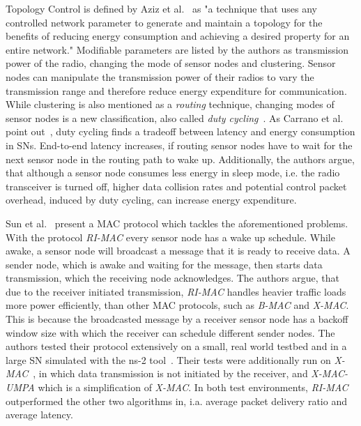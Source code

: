 Topology Control is defined by Aziz et al.~\cite{aziz2013survey} as "a
technique that uses any controlled network parameter to generate and maintain a
topology for the benefits of reducing energy consumption and achieving a
desired property for an entire network." Modifiable parameters are listed by
the authors as transmission power of the radio, changing the mode of sensor
nodes and clustering. Sensor nodes can manipulate the transmission power of
their radios to vary the transmission range and therefore reduce energy
expenditure for communication. While clustering is also mentioned as a
\textit{routing} technique, changing modes of sensor nodes is a new
classification, also called \textit{duty cycling}~\cite{carrano2014survey,
lin2004medium, buettner2006x}. As Carrano et al. point
out~\cite{carrano2014survey}, duty cycling finds a tradeoff between latency and
energy consumption in \acp{SN}. End-to-end latency increases, if routing sensor
nodes have to wait for the next sensor node in the routing path to wake up.
Additionally, the authors argue, that although a sensor node consumes less
energy in sleep mode, i.e. the radio transceiver is turned off, higher data
collision rates and potential control packet overhead, induced by duty cycling,
can increase energy expenditure.

Sun et al.~\cite{sun2008ri} present a \ac{MAC} protocol which tackles the
aforementioned problems. With the protocol \textit{RI-MAC} every sensor node
has a wake up schedule. While awake, a sensor node will broadcast a message
that it is ready to receive data. A sender node, which is awake and waiting for
the message, then starts data transmission, which the receiving node
acknowledges. The authors argue, that due to the receiver initiated
transmission, \textit{RI-MAC} handles heavier traffic loads more power
efficiently, than other \ac{MAC} protocols, such as \textit{B-MAC} and
\textit{X-MAC}. This is because the broadcasted message by a receiver sensor
node has a backoff window size with which the receiver can schedule different
sender nodes. The authors tested their protocol extensively on a small, real
world testbed and in a large \ac{SN} simulated with the ns-2
tool~\cite{bajaj1999improving}. Their tests were additionally run on
\textit{X-MAC}~\cite{buettner2006x}, in which data transmission is not
initiated by the receiver, and \textit{X-MAC-UMPA} which is a simplification of
\textit{X-MAC}. In both test environments, \textit{RI-MAC} outperformed the
other two algorithms in, i.a. average packet delivery ratio and average
latency.


